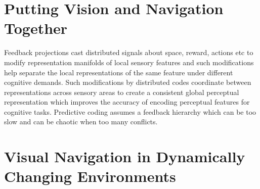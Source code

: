 \section{Putting Vision and Navigation Together}

Feedback projections cast distributed signals about space, reward, actions etc to modify representation manifolds of local sensory features and such modifications help separate the local representations of the same feature under different cognitive demands. Such modifications by distributed codes coordinate between representations across sensory areas to create a consistent global perceptual representation which improves the accuracy of encoding perceptual features for cognitive tasks. Predictive coding assumes a feedback hierarchy which can be too slow and can be chaotic when too many conflicts.
\cite{wen_one-shot_2024}
\section{Visual Navigation in Dynamically Changing Environments}




